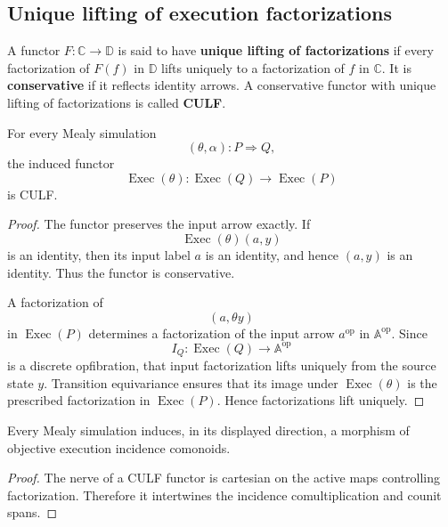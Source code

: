 \subsection{Unique lifting of execution factorizations}
\label{subsec:unique-lifting-factorizations}

A functor \(F:\mathbb C\to\mathbb D\) is said to have
\textbf{unique lifting of factorizations} if every factorization of
\(F(f)\) in \(\mathbb D\) lifts uniquely to a factorization of \(f\) in
\(\mathbb C\). It is \textbf{conservative} if it reflects identity arrows.
A conservative functor with unique lifting of factorizations is called
\textbf{CULF}.

\begin{proposition}
\label{prop:simulation-functors-culf}
For every Mealy simulation
\[
    (\theta,\alpha):P\Longrightarrow Q,
\]
the induced functor
\[
    \operatorname{Exec}(\theta):
    \operatorname{Exec}(Q)
    \longrightarrow
    \operatorname{Exec}(P)
\]
is CULF.
\end{proposition}

\begin{proof}
The functor preserves the input arrow exactly. If
\[
    \operatorname{Exec}(\theta)(a,y)
\]
is an identity, then its input label \(a\) is an identity, and hence
\((a,y)\) is an identity. Thus the functor is conservative.

A factorization of
\[
    (a,\theta y)
\]
in \(\operatorname{Exec}(P)\) determines a factorization of the input
arrow \(a^{\mathrm{op}}\) in \(\mathbb A^{\mathrm{op}}\). Since
\[
    I_Q:\operatorname{Exec}(Q)\to\mathbb A^{\mathrm{op}}
\]
is a discrete opfibration, that input factorization lifts uniquely from the
source state \(y\). Transition equivariance ensures that its image under
\(\operatorname{Exec}(\theta)\) is the prescribed factorization in
\(\operatorname{Exec}(P)\). Hence factorizations lift uniquely.
\end{proof}

\begin{corollary}
\label{cor:simulation-incidence-comonoid-map}
Every Mealy simulation induces, in its displayed direction, a morphism of
objective execution incidence comonoids.
\end{corollary}

\begin{proof}
The nerve of a CULF functor is cartesian on the active maps controlling
factorization. Therefore it intertwines the incidence comultiplication and
counit spans.
\end{proof}

